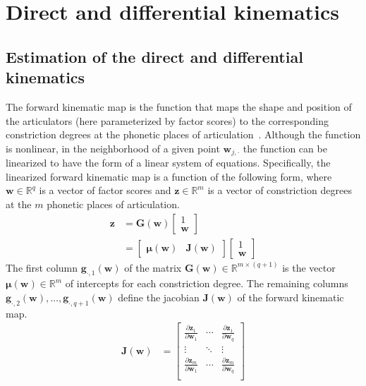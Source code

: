 \documentclass[preprint]{JASAnew}
\begin{document}
\section{Direct and differential kinematics}
\label{sec:forwardkinematicmap}

\subsection{Estimation of the direct and differential kinematics}

The forward kinematic map is the function that maps the shape and position of the articulators (here parameterized by factor scores) to the corresponding constriction degrees at the phonetic places of articulation~\citep{lammert2013statistical}. 
%
Although the function is nonlinear, in the neighborhood of a given point $\mathbf{w}_{j,\cdot}$ the function can be linearized to have the form of a linear system of equations.
%
Specifically, the linearized forward kinematic map is a function of the following form, where $\mathbf{w} \in \mathbb{R}^q$ is a vector of factor scores and $\mathbf{z} \in \mathbb{R}^{m}$ is a vector of constriction degrees at the $m$ phonetic places of articulation.
%
\begin{align}
\mathbf{z} 
&= 
\mathbf{G}\left( \mathbf{w} \right) 
\left[ \begin{array}{c} 1 \\ \mathbf{w} \end{array} \right] \\
&= 
\left[ \begin{array}{cc} 
\boldsymbol{\mu}\left(\mathbf{w}\right) & \mathbf{J}\left(\mathbf{w}\right) 
\end{array} \right]
\left[ \begin{array}{c} 1 \\ \mathbf{w} \end{array} \right]
\end{align}
%
The first column $\mathbf{g}_{\cdot,1}(\mathbf{w})$ of the matrix $\mathbf{G}(\mathbf{w}) \in \mathbb{R}^{m\times (q+1)}$ is the vector $\boldsymbol{\mu}(\mathbf{w}) \in \mathbb{R}^m$ of intercepts for each constriction degree. 
%
The remaining columns $\mathbf{g}_{\cdot,2}(\mathbf{w}), \ldots, \mathbf{g}_{\cdot,q+1}(\mathbf{w})$ define the jacobian $\mathbf{J}(\mathbf{w})$ of the forward kinematic map. 
% 
\begin{align}
\mathbf{J}(\mathbf{w}) 
&=
\left[ \begin{array}{ccc} 
\frac{\partial \mathbf{z}_1}{\partial \mathbf{w}_1} & \cdots & \frac{\partial \mathbf{z}_1}{\partial \mathbf{w}_q} \\
\vdots & \ddots & \vdots \\
\frac{\partial \mathbf{z}_m}{\partial \mathbf{w}_1} & \cdots & \frac{\partial \mathbf{z}_m}{\partial \mathbf{w}_q} \\
\end{array} \right]
\end{align}
\end{document}
